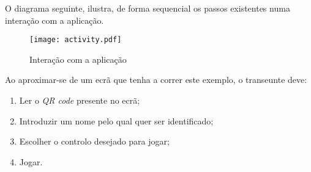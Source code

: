 	O diagrama seguinte, ilustra, de forma sequencial os passos existentes numa interação com a aplicação.
	\newline

	\begin{figure}[ht]
	\centering
	\texttt{[image: activity.pdf]}
	\caption[Utilização]{Interação com a aplicação}
	\label{fig:interagir}
	\end{figure}

	Ao aproximar-se de um ecrã que tenha a correr este exemplo, o transeunte deve:

	\begin{enumerate}
		\item Ler o \textit{QR code} presente no ecrã;
		\item Introduzir um nome pelo qual quer ser identificado;
		\item Escolher o controlo desejado para jogar;
		\item Jogar.
	\end{enumerate}


	


	





